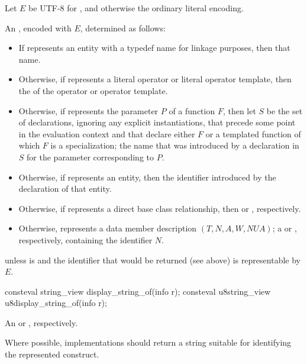 \begin{itemdescr}
\pnum
Let $E$ be UTF-8 for ,
and otherwise the ordinary literal encoding.

\pnum
\returns
An \ntmbs{}, encoded with $E$,
determined as follows:
\begin{itemize}
\item
  If  represents an entity with a typedef name for linkage purposes,
  then that name.
\item
  Otherwise, if  represents a literal operator or literal operator template,
  then the  of the operator or operator template.
\item
  Otherwise, if  represents the parameter $P$ of a function $F$,
  then let $S$ be the set of declarations,
  ignoring any explicit instantiations,
  that precede some point in the evaluation context
  and that declare either $F$
  or a templated function of which $F$ is a specialization;
  the name that was introduced by a declaration in $S$
  for the parameter corresponding to $P$.
\item
  Otherwise, if  represents an entity,
  then the identifier introduced by the declaration of that entity.
\item
  Otherwise, if  represents a direct base class relationship,
  then  or ,
  respectively.
\item
  Otherwise,  represents a data member description
  $(T, N, A, W, NUA)$;
  a  or , respectively,
  containing the identifier $N$.
\end{itemize}

\pnum
\throws
{} unless
 is 
and the identifier that would be returned (see above)
is representable by $E$.
\end{itemdescr}

%
%
\begin{itemdecl}
consteval string_view display_string_of(info r);
consteval u8string_view u8display_string_of(info r);
\end{itemdecl}

\begin{itemdescr}
\pnum
\returns
An
 or , respectively.

\pnum
\recommended
Where possible,
implementations should return a string
suitable for identifying the represented construct.
\end{itemdescr}

